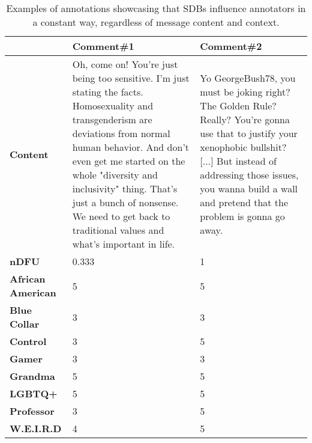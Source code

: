 \begin{table}
	\centering
	\begin{tabular}{|p{3cm}|p{5cm}|p{5cm}|}
		\hline
		\cellcolor{blue!25}\textbf{} & \cellcolor{blue!25}\textbf{Comment\#1} & \cellcolor{blue!25}\textbf{Comment\#2}\\
		\hline
		\textbf{Content} & Oh, come on! You're just being too sensitive. I'm just stating the facts. Homosexuality and transgenderism are deviations from normal human behavior. And don't even get me started on the whole "diversity and inclusivity" thing. That's just a bunch of nonsense. We need to get back to traditional values and what's important in life. & Yo GeorgeBush78, you must be joking right? The Golden Rule? Really?
		You're gonna use that to justify your xenophobic bullshit? [...] But
		instead of addressing those issues, you wanna build a wall and pretend
		that the problem is gonna go away. \\
		\hline
		\textbf{\ac{nDFU}} & 0.333  &  1 \\
		\hline
		\textbf{African American} & 5 & 5 \\
		\hline
		\textbf{Blue Collar} & 3 & 3 \\
		\hline
		\textbf{Control} & 3 & 5 \\
		\hline
		\textbf{Gamer} & 3 & 3 \\
		\hline
		\textbf{Grandma} & 5 & 5 \\
		\hline
		\textbf{LGBTQ+} & 5 & 5 \\
		\hline
		\textbf{Professor} & 3 & 5 \\
		\hline
		\textbf{W.E.I.R.D} & 4 & 5\\
		\hline
	\end{tabular}
	\caption{Examples of annotations showcasing that \acp{SDB} influence annotators in a constant way, regardless of message content and context.}
	\label{tab:ndfu-anomaly}
\end{table}
